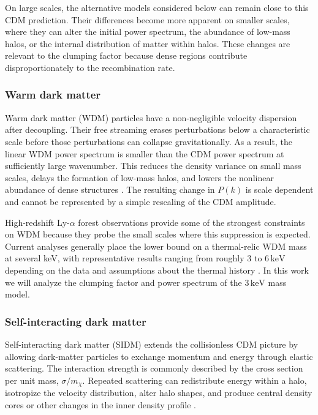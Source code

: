 \documentclass[%
 reprint,
nofootinbib,
 amsmath,amssymb,
 aps,
]{revtex4-2}
\begin{document}
On large scales, the alternative models considered below can remain close to this CDM prediction. Their differences become more apparent on smaller scales, where they can alter the initial power spectrum, the abundance of low-mass halos, or the internal distribution of matter within halos. These changes are relevant to the clumping factor because dense regions contribute disproportionately to the recombination rate.

\subsubsection{Warm dark matter}

Warm dark matter (WDM) particles have a non-negligible velocity dispersion after decoupling. Their free streaming erases perturbations below a characteristic scale before those perturbations can collapse gravitationally. As a result, the linear WDM power spectrum is smaller than the CDM power spectrum at sufficiently large wavenumber. This reduces the density variance on small mass scales, delays the formation of low-mass halos, and lowers the nonlinear abundance of dense structures \cite{villasenor2022wdm,irsic2024wdm}. The resulting change in $P(k)$ is scale dependent and cannot be represented by a simple rescaling of the CDM amplitude.

High-redshift Ly-$\alpha$ forest observations provide some of the strongest constraints on WDM because they probe the small scales where this suppression is expected. Current analyses generally place the lower bound on a thermal-relic WDM mass at several keV, with representative results ranging from roughly $3$ to $6\,\mathrm{keV}$ depending on the data and assumptions about the thermal history \cite{irsic2024wdm,villasenor2022wdm}. In this work we will analyze the clumping factor and power spectrum of the $3\,\mathrm{keV}$ mass model.


\subsubsection{Self-interacting dark matter}

Self-interacting dark matter (SIDM) extends the collisionless CDM picture by allowing dark-matter particles to exchange momentum and energy through elastic scattering. The interaction strength is commonly described by the cross section per unit mass, $\sigma/m_\chi$. Repeated scattering can redistribute energy within a halo, isotropize the velocity distribution, alter halo shapes, and produce central density cores or other changes in the inner density profile \cite{tulin2018sidm}.
\end{document}

